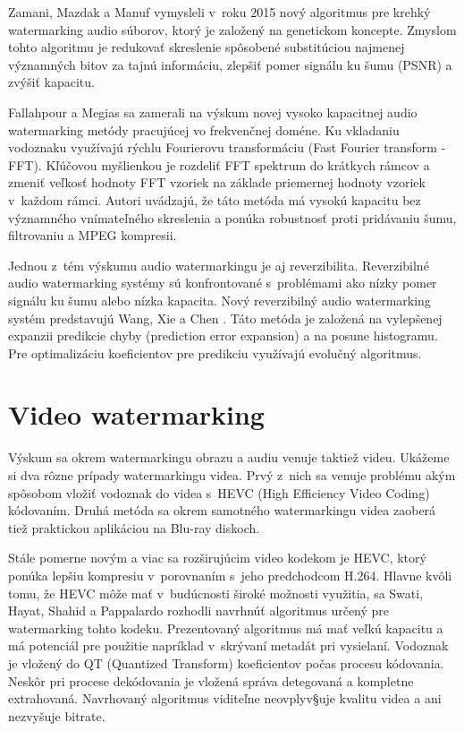 Zamani, Mazdak a Manuf \cite{Zamani2015} vymysleli v~roku 2015 nový algoritmus pre krehký watermarking audio súborov, ktorý je založený na genetickom koncepte. Zmyslom tohto algoritmu je redukovať skreslenie spôsobené substitúciou najmenej významných bitov za tajnú informáciu, zlepšiť pomer signálu ku šumu (PSNR) a zvýšiť kapacitu.

Fallahpour a Megias \cite{Fallahpour} sa zamerali na výskum novej vysoko kapacitnej audio watermarking metódy pracujúcej vo frekvenčnej doméne. Ku vkladaniu vodoznaku využívajú rýchlu Fourierovu transformáciu (Fast Fourier transform - FFT). Kľúčovou myšlienkou je rozdeliť FFT spektrum do krátkych rámcov a zmeniť veľkosť hodnoty FFT vzoriek na základe priemernej hodnoty vzoriek v~každom rámci. Autori uvádzajú, že táto metóda má vysokú kapacitu bez významného vnímateľného skreslenia a ponúka robustnosť proti pridávaniu šumu, filtrovaniu a MPEG kompresii.

Jednou z~tém výskumu audio watermarkingu je aj reverzibilita. Reverzibilné audio watermarking systémy sú konfrontované s~problémami ako nízky pomer signálu ku šumu alebo nízka kapacita. Nový reverzibilný audio watermarking systém predstavujú Wang, Xie a Chen \cite{Wang2014}. Táto metóda je založená na vylepšenej expanzii predikcie chyby (prediction error expansion) a na posune histogramu. Pre optimalizáciu koeficientov pre predikciu využívajú evolučný algoritmus.

\section{Video watermarking}
Výskum sa okrem watermarkingu obrazu a audiu venuje taktiež videu. Ukážeme si dva rôzne prípady watermarkingu videa. Prvý z~nich sa venuje problému akým spôsobom vložiť vodoznak do videa s~HEVC (High Efficiency Video Coding) kódovaním. Druhá metóda sa okrem samotného watermarkingu videa zaoberá tiež praktickou aplikáciou na Blu-ray diskoch.

Stále pomerne novým a viac sa rozširujúcim video kodekom je HEVC, ktorý ponúka lepšiu kompresiu v~porovnaním s~jeho predchodcom H.264. Hlavne kvôli tomu, že HEVC môže mať v~budúcnosti široké možnosti využitia, sa Swati, Hayat, Shahid a Pappalardo \cite{Swati2014} rozhodli navrhnúť algoritmus určený pre watermarking tohto kodeku. Prezentovaný algoritmus má mať veľkú kapacitu a má potenciál pre použitie napríklad v~skrývaní metadát pri vysielaní. Vodoznak je vložený do QT (Quantized Transform) koeficientov počas procesu kódovania. Neskôr pri procese dekódovania je vložená správa detegovaná a kompletne extrahovaná. Navrhovaný algoritmus viditeľne neovplyv§uje kvalitu videa a ani nezvyšuje bitrate.

